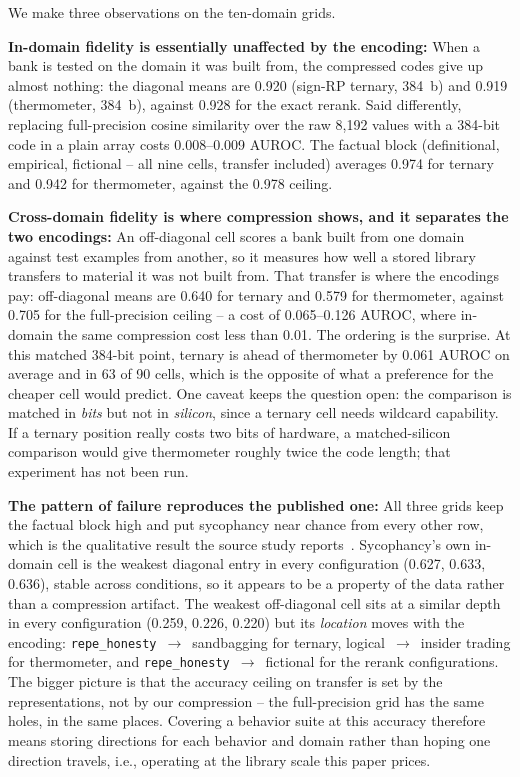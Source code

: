 \documentclass[conference]{IEEEtran}
\newcommand{\auroc}{{AUROC}\xspace}
\newcommand{\signrp}{{sign-RP}\xspace}
\begin{document}
We make three observations on the ten-domain grids.

\textbf{In-domain fidelity is essentially unaffected by the encoding:}
When a bank is tested on the domain it was built from, the compressed
codes give up almost nothing: the diagonal means are 0.920 (\signrp
ternary, 384~b) and 0.919 (thermometer, 384~b), against 0.928 for the
exact rerank. Said differently, replacing full-precision cosine
similarity over the raw 8{,}192 values with a 384-bit code in a plain
array costs 0.008--0.009 \auroc. The factual block (definitional,
empirical, fictional -- all nine cells, transfer included) averages
0.974 for ternary and 0.942 for thermometer, against the 0.978
ceiling.

\textbf{Cross-domain fidelity is where compression shows, and it
separates the two encodings:} An off-diagonal cell scores a bank
built from one domain against test examples from another, so it
measures how well a stored library transfers to material it was not
built from. That transfer is where the encodings pay: off-diagonal
means are 0.640 for ternary and 0.579 for thermometer, against 0.705
for the full-precision ceiling -- a cost of 0.065--0.126 \auroc,
where in-domain the same compression cost less than 0.01. The
ordering is the surprise. At this matched 384-bit point, ternary is
ahead of thermometer by 0.061 \auroc on average and in 63 of 90
cells, which is the opposite of what a preference for the cheaper
cell would predict. One caveat keeps the question open: the
comparison is matched in \emph{bits} but not in \emph{silicon},
since a ternary cell needs wildcard capability. If a ternary position
really costs two bits of hardware, a matched-silicon comparison would
give thermometer roughly twice the code length; that experiment has
not been run.

\textbf{The pattern of failure reproduces the published one:} All three
grids keep the factual block high and put sycophancy near chance from
every other row, which is the qualitative result the source study
reports~\cite{ying2026spectrum}. Sycophancy's own in-domain cell is the
weakest diagonal entry in every configuration (0.627, 0.633, 0.636),
stable across conditions, so it appears to be a property of the data
rather than a compression artifact. The weakest off-diagonal cell sits
at a similar depth in every configuration (0.259, 0.226, 0.220) but
its \emph{location} moves with the encoding:
\texttt{repe\_honesty}~$\to$~sandbagging for ternary,
logical~$\to$~insider trading for thermometer, and
\texttt{repe\_honesty}~$\to$~fictional for the rerank
configurations. The bigger picture is that the accuracy ceiling on
transfer is set by the representations, not by our compression -- the
full-precision grid has the same holes, in the same places. Covering
a behavior suite at this accuracy therefore means storing directions
for each behavior and domain rather than hoping one direction
travels, i.e., operating at the library scale this paper
prices.
\end{document}
